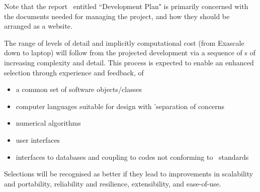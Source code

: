 Note that the report~\cite{y2d34} entitled ``Development Plan" is primarily
concerned with the documents needed for managing the project, and how
they should be arranged as a website.

The range of levels of detail and implicitly computational cost (from Exascale 
down to laptop) will follow from the projected development via a sequence of 
\papp s of increasing complexity and detail. This process is expected to 
enable an enhanced selection through experience and feedback, of
\begin{itemize}
\item a common set of software objects/classes
\item computer languages suitable for design with 'separation of concerns
\item numerical algorithms
\item user interfaces
\item interfaces to databases and coupling to codes not conforming to \nep \ standards
\end{itemize}
Selections will be recognised as better if they lead to improvements in 
scalability and portability, reliability and resilience, extensibility, and 
ease-of-use. 



\clearpage

\clearpage

